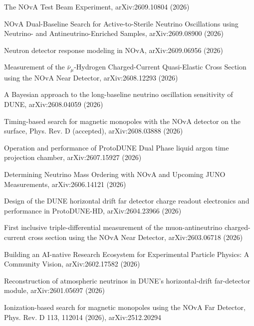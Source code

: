\begin{list2}
\item The NOvA Test Beam Experiment, arXiv:2609.10804 (2026) %
\item NOvA Dual-Baseline Search for Active-to-Sterile Neutrino Oscillations using Neutrino- and Antineutrino-Enriched Samples, arXiv:2609.08900 (2026) %
\item Neutron detector response modeling in NOvA, arXiv:2609.06956 (2026) %
\item Measurement of the $\bar\nu_\mu$-Hydrogen Charged-Current Quasi-Elastic Cross Section using the NOvA Near Detector, arXiv:2608.12293 (2026) %
\item A Bayesian approach to the long-baseline neutrino oscillation sensitivity of DUNE, arXiv:2608.04059 (2026) %
\item Timing-based search for magnetic monopoles with the NOvA detector on the surface, Phys. Rev. D (accepted), arXiv:2608.03888 (2026) %
\item Operation and performance of ProtoDUNE Dual Phase liquid argon time projection chamber, arXiv:2607.15927 (2026) %
\item Determining Neutrino Mass Ordering with NOvA and Upcoming JUNO Measurements, arXiv:2606.14121 (2026) %
\item Design of the DUNE horizontal drift far detector charge readout electronics and performance in ProtoDUNE-HD, arXiv:2604.23966 (2026) %
\item First inclusive triple-differential measurement of the muon-antineutrino charged-current cross section using the NOvA Near Detector, arXiv:2603.06718 (2026) %
\item Building an AI-native Research Ecosystem for Experimental Particle Physics: A Community Vision, arXiv:2602.17582 (2026) %
\item Reconstruction of atmospheric neutrinos in DUNE's horizontal-drift far-detector module, arXiv:2601.05697 (2026) %
\item Ionization-based search for magnetic monopoles using the NOvA Far Detector, Phys. Rev. D 113, 112014 (2026), arXiv:2512.20294 %

\end{list2}
